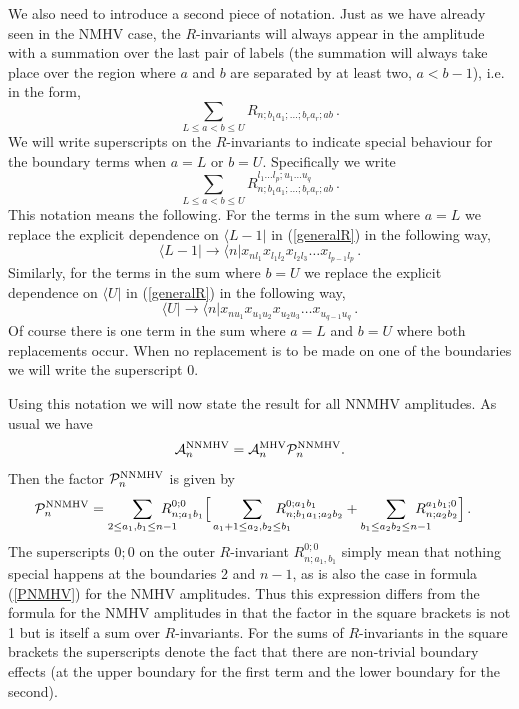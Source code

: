 \documentclass[12pt]{article}
\def \be  {\begin{equation}}
\def \ee  {\end{equation}}
\begin{document}
We also need to introduce a second piece of notation. Just as we have already seen in the NMHV case, the $R$-invariants will always appear in the amplitude with a summation over the last pair of labels (the summation will always take place over the region where $a$ and $b$ are separated by at least two, $a<b-1$), i.e. in the form,
\be
\sum_{L\leq a<b \leq U} \!\!\!\!\!\! R_{n;b_1a_1;\ldots;b_ra_r;ab} \, .
\ee
We will write superscripts on the $R$-invariants to indicate special behaviour for the boundary terms when $a=L$ or $b=U$.
Specifically we write
\be
\sum_{L\leq a<b \leq U} \!\!\!\!\!\! R_{n;b_1a_1;\ldots;b_ra_r;ab}^{l_1\ldots l_p;u_1\ldots u_q} \, .
\label{superscripts}
\ee
This notation means the following. For the terms in the sum where $a=L$ we replace the explicit dependence on $\langle L-1|$ in (\ref{generalR}) in the following way,
\be
\langle L-1 | \longrightarrow \langle n|x_{nl_1} x_{l_1l_2} x_{l_2l_3} \ldots x_{l_{p-1} l_p} \, .
\label{Lrep}
\ee
Similarly, for the terms in the sum where $b=U$ we replace the explicit dependence on $\langle U|$ in (\ref{generalR}) in the following way,
\be
\langle U | \longrightarrow \langle n | x_{nu_1} x_{u_1u_2} x_{u_2u_3} \ldots x_{u_{q-1}u_q} \, .
\label{Urep}
\ee
Of course there is one term in the sum where $a=L$ and $b=U$ where both replacements occur. When no replacement is to be made on one of the boundaries we will write the superscript $0$.

Using this notation we will now state the result for all NNMHV amplitudes. As usual we have
\be
\mathcal{A}_n^{\rm NNMHV} = \mathcal{A}_n^{\rm MHV} \mathcal{P}_n^{\rm NNMHV}.
\label{ANNMHV}
\ee
Then the factor $\mathcal{P}_n^{\rm NNMHV}$ is given by
\begin{align}
\label{PNNMHVnew}
\mathcal{P}_n^{\rm NNMHV} = \sum_{2\leq a_1,b_1 \leq n-1}
\!\!\!\!\!\!\!\! R_{n;a_1b_1}^{0;0} \Bigl[ &\sum_{a_1+1 \leq a_2,b_2 \leq
  b_1} \!\!\!\!\!\!\!\! R_{n;b_1a_1;a_2b_2}^{0;a_1b_1}
  +  \sum_{b_1 \leq a_2b_2 \leq n-1} \!\!\!\!\!\!\!\! R_{n;a_2b_2}^{a_1b_1;0} \Bigr]\,.
\end{align}
The superscripts $0;0$ on the outer $R$-invariant $R_{n;a_1,b_1}^{0;0}$ simply mean that nothing special happens at the boundaries 2 and $n-1$, as is also the case in formula (\ref{PNMHV}) for the NMHV amplitudes. Thus this expression differs from the formula for the NMHV amplitudes in that the factor in the square brackets is not 1 but is itself a sum over $R$-invariants. For the sums of $R$-invariants in the square brackets the superscripts denote the fact that there are non-trivial boundary effects (at the upper boundary for the first term and the lower boundary for the second).
\end{document}
